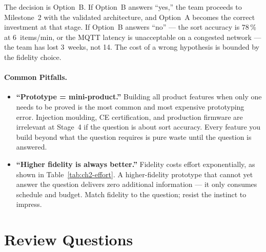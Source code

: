 The decision is Option~B.
If Option~B answers ``yes,'' the team proceeds to Milestone~2 with the
validated architecture, and Option~A becomes the correct investment at that
stage.
If Option~B answers ``no'' --- the sort accuracy is 78\,\% at 6~items/min,
or the MQTT latency is unacceptable on a congested network --- the team has
lost 3~weeks, not 14.
The cost of a wrong hypothesis is bounded by the fidelity choice.

\paragraph{Common Pitfalls.}
\begin{itemize}
  \item \textbf{``Prototype = mini-product.''}
    Building all product features when only one needs to be proved is the
    most common and most expensive prototyping error.
    Injection moulding, CE certification, and production firmware are
    irrelevant at Stage~4 if the question is about sort accuracy.
    Every feature you build beyond what the question requires is pure waste
    until the question is answered.

  \item \textbf{``Higher fidelity is always better.''}
    Fidelity costs effort exponentially, as shown in
    Table~\ref{tab:ch2-effort}.
    A higher-fidelity prototype that cannot yet answer the question delivers
    zero additional information --- it only consumes schedule and budget.
    Match fidelity to the question; resist the instinct to impress.
\end{itemize}

\section*{Review Questions}

